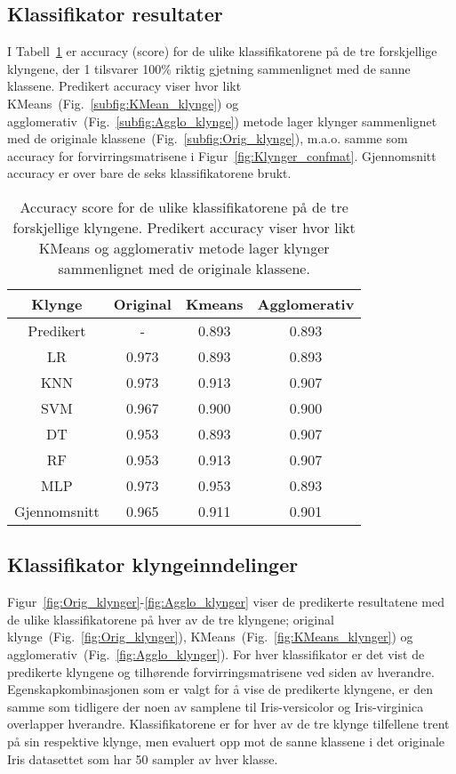 \documentclass[twocolumn,norwegian]{article}
\begin{document}
	\subsection{Klassifikator resultater}
	I Tabell~\ref{tab:Klassifikatorer} er accuracy (score) for de ulike klassifikatorene på de tre forskjellige klyngene, der 1 tilsvarer 100\% riktig gjetning sammenlignet med de sanne klassene. Predikert accuracy viser hvor likt KMeans~(Fig.~\ref{subfig:KMean_klynge}) og agglomerativ~(Fig.~\ref{subfig:Agglo_klynge}) metode lager klynger sammenlignet med de originale klassene~(Fig.~\ref{subfig:Orig_klynge}), m.a.o. samme som accuracy for forvirringsmatrisene i Figur~\ref{fig:Klynger_confmat}. Gjennomsnitt accuracy er over bare de seks klassifikatorene brukt.
	\begin{table}[h!]
		\centering
		\begin{tabular}{| c | c | c | c |}
			\hline
			\rule{0pt}{10pt}Klynge & Original & Kmeans & Agglomerativ \\
			\hline
			\rule{0pt}{10pt}Predikert & - & 0.893 & 0.893 \\
			\hdashline
			\rule{0pt}{10pt}LR & 0.973 & 0.893 & 0.893 \\
			\rule{0pt}{10pt}KNN & 0.973 & 0.913 &  0.907 \\
			\rule{0pt}{10pt}SVM & 0.967 & 0.900 & 0.900 \\
			\rule{0pt}{10pt}DT & 0.953 & 0.893 & 0.907 \\
			\rule{0pt}{10pt}RF & 0.953 & 0.913 & 0.907 \\
			\rule{0pt}{10pt}MLP & 0.973 & 0.953 &  0.893 \\
			\hline
			\rule{0pt}{10pt}Gjennomsnitt & 0.965 & 0.911 & 0.901 \\
			\hline
		\end{tabular}
		\caption{Accuracy score for de ulike klassifikatorene på de tre forskjellige klyngene. Predikert accuracy viser hvor likt KMeans og agglomerativ metode lager klynger sammenlignet med de originale klassene.}
		\label{tab:Klassifikatorer}
	\end{table}
	
	
	\subsection{Klassifikator klyngeinndelinger}
	Figur~\ref{fig:Orig_klynger}-\ref{fig:Agglo_klynger} viser de predikerte resultatene med de ulike klassifikatorene på hver av de tre klyngene; original klynge~(Fig.~\ref{fig:Orig_klynger}), KMeans~(Fig.~\ref{fig:KMeans_klynger}) og agglomerativ~(Fig.~\ref{fig:Agglo_klynger}). For hver klassifikator er det vist de predikerte klyngene og tilhørende forvirringsmatrisene ved siden av hverandre. Egenskapkombinasjonen som er valgt for å vise de predikerte klyngene, er den samme som tidligere der noen av samplene til Iris-versicolor og Iris-virginica overlapper hverandre. Klassifikatorene er for hver av de tre klynge tilfellene trent på sin respektive klynge, men evaluert opp mot de sanne klassene i det originale Iris datasettet som har 50 sampler av hver klasse.
	
\end{document}
